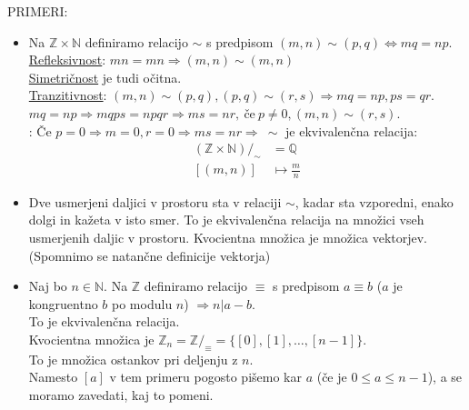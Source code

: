 \documentclass[a4paper,12pt]{article}
\begin{document}
PRIMERI:
\begin{itemize}
\item Na $\mathbb{Z}\times \mathbb{N}$ definiramo relacijo $\sim$ s predpisom $(m,n)\sim(p,q)\Leftrightarrow mq=np$.\\

\underline{Refleksivnost}: $mn=mn\Rightarrow (m,n)\sim(m,n)$ \\

\underline{Simetričnost} je tudi očitna.\\

\underline{Tranzitivnost}: $(m,n)\sim(p,q),(p,q)\sim(r,s)\Rightarrow mq=np,ps=qr$. \\


$mq=np \Rightarrow mqps=npqr \Rightarrow ms=nr, ~\text{če}~ p \neq 0, (m,n)\sim(r,s)$. \\

: Če $p=0 \Rightarrow m=0,r=0 \Rightarrow ms=nr \Rightarrow ~ \sim$ je ekvivalenčna relacija:
\begin{align*}
(\mathbb{Z}\times \mathbb{N})/_\sim & = \mathbb{Q} \\
[(m,n)] & \mapsto \frac{m}{n}
\end{align*}

\item Dve usmerjeni daljici v prostoru sta v relaciji $\sim$, kadar sta vzporedni, enako dolgi in kažeta v isto smer. To je ekvivalenčna relacija na množici vseh usmerjenih daljic v prostoru. Kvocientna množica je množica vektorjev. (Spomnimo se natančne  \linebreak definicije vektorja) \\

\item Naj bo $n\in \mathbb{N}$. Na $\mathbb{Z}$ definiramo relacijo $\equiv$ s predpisom $a\equiv b$ ($a$ je kongruentno $b$ po modulu $n$) $\Rightarrow n | a-b$. \\

To je ekvivalenčna relacija.\\

Kvocientna množica je $\mathbb{Z}_n=\mathbb{Z}/_\equiv = \{[0],[1],\ldots,[n-1]\}$. \\

To je množica ostankov pri deljenju z $n$. \\

Namesto $[a]$ v tem primeru pogosto pišemo kar $a$ (če je $0\leq a \leq n-1$), a se moramo zavedati, kaj to pomeni. \\
\end{itemize}
\end{document}
